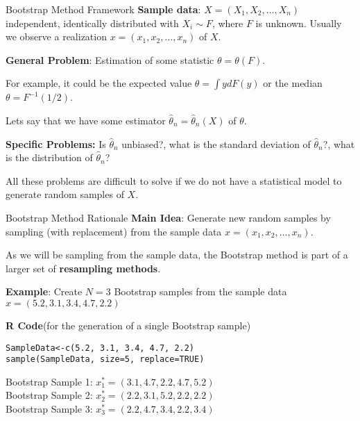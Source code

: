 \documentclass[8pt]{beamer}
\begin{document}
\begin{frame}{Bootstrap Method Framework}
\textbf{Sample data}: $X=(X_1, X_2, \ldots, X_n)$ independent, identically distributed with $X_i \sim F$, where $F$ is unknown. Usually we observe a realization $x=(x_1,x_2,\ldots, x_n)$ of $X$.

\vspace{3mm}

\textbf{General Problem}: Estimation of some statistic $\theta=\theta(F)$.

\vspace{3mm}
 
For example, it could be the expected value $\displaystyle{\theta=\int y d F(y)}$ or the median $\theta=F^{-1}(1/2)$.

\vspace{3mm}
 
Lets say that we have some estimator $\widehat{\theta}_n=\widehat{\theta}_n(X)$  of $\theta$. 

\vspace{3mm}
 
\textbf{Specific Problems:} Is $\widehat{\theta}_n$ unbiased?, what is the standard deviation of $\widehat{\theta}_n$?, what is the distribution of $\widehat{\theta}_n$?

\vspace{3mm}
  
All these problems are difficult to solve if we do not have a statistical model to generate random samples of $X$.
\end{frame}

\begin{frame}[fragile]{Bootstrap Method Rationale}
\textbf{Main Idea}: Generate new random samples by sampling (with replacement) from the sample data $x=(x_1, x_2, \ldots, x_n)$. 

\vspace{2mm}

As we will be sampling from the sample data, the Bootstrap method is part of a larger set of \textbf{resampling methods}.

\vspace{2mm}

\textbf{Example}: Create $N=3$ Bootstrap samples from the sample data $x=(5.2, 3.1, 3.4, 4.7, 2.2)$

\vspace{2mm}

\textbf{R Code}(for the generation of a single Bootstrap sample)
\begin{lstlisting}
SampleData<-c(5.2, 3.1, 3.4, 4.7, 2.2)
sample(SampleData, size=5, replace=TRUE)
\end{lstlisting}

Bootstrap Sample 1: $x_1^*=(3.1, 4.7, 2.2, 4.7, 5.2)$\\
Bootstrap Sample 2: $x_2^*=(2.2, 3.1, 5.2, 2.2, 2.2)$\\
Bootstrap Sample 3: $x_3^*=(2.2, 4.7, 3.4, 2.2, 3.4)$\\
\end{frame}
\end{document}
